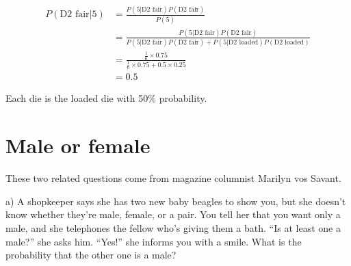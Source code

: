 \documentclass[
  letterpaper,
  DIV=11,
  numbers=noendperiod]{scrreprt}
\begin{document}
\begin{tcolorbox}[enhanced jigsaw, title=\textcolor{quarto-callout-tip-color}{\faLightbulb}\hspace{0.5em}{Answer}, toprule=.15mm, colback=white, breakable, titlerule=0mm, colframe=quarto-callout-tip-color-frame, coltitle=black, opacityback=0, rightrule=.15mm, colbacktitle=quarto-callout-tip-color!10!white, bottomtitle=1mm, opacitybacktitle=0.6, arc=.35mm, bottomrule=.15mm, toptitle=1mm, leftrule=.75mm, left=2mm]

\begin{align*}
P(\text{D2 fair}|5)&=\frac{P(5|\text{D2 fair})P(\text{D2 fair})}{P(5)} \\[6pt]
&=\frac{P(5|\text{D2 fair})P(\text{D2 fair})}{P(5|\text{D2 fair})P(\text{D2 fair})+P(5|\text{D2 loaded})P(\text{D2 loaded})} \\[6pt]
&=\frac{\frac{1}{6}\times 0.75}{\frac{1}{6}\times 0.75+0.5\times 0.25} \\[6pt]
&=0.5
\end{align*}

Each die is the loaded die with 50\% probability.

\end{tcolorbox}

\hypertarget{male-or-female}{%
\section{Male or female}\label{male-or-female}}

These two related questions come from magazine columnist Marilyn vos
Savant.

a) A shopkeeper says she has two new baby beagles to show you, but she
doesn't know whether they're male, female, or a pair. You tell her that
you want only a male, and she telephones the fellow who's giving them a
bath. ``Is at least one a male?'' she asks him. ``Yes!'' she informs you
with a smile. What is the probability that the other one is a male?
\end{document}
